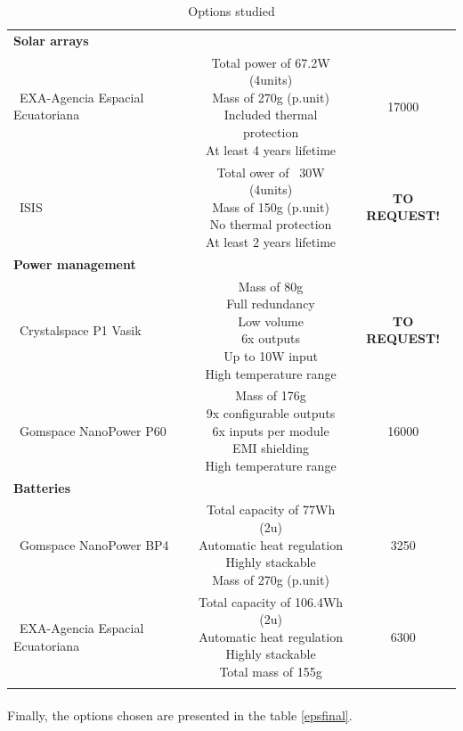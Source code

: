\begin{longtable}{| l | c | c | }
\rowcolor[gray]{0.85} \textbf{Solar arrays} &  &  \\
	   ~EXA-Agencia Espacial Ecuatoriana & \makecell{Total power of 67.2W (4units)\\ Mass of 270g (p.unit) \\ Included thermal protection \\At least 4 years lifetime} & 17000 \\
	   \hline
	   ~ISIS & \makecell{Total ower of ~30W (4units) \\ Mass of 150g (p.unit) \\ No thermal protection \\At least 2 years lifetime} & \textbf{TO REQUEST!} \\
	   \hline
\rowcolor[gray]{0.85} \textbf{Power management} &  &  \\
	   ~Crystalspace P1 Vasik & \makecell{Mass of 80g \\ Full redundancy \\ Low volume \\ 6x outputs \\ Up to 10W input \\ High temperature range} & \textbf{TO REQUEST!} \\
	\hline
	   ~Gomspace NanoPower P60 & \makecell{Mass of 176g \\ 9x configurable outputs \\ 6x inputs per module \\ EMI shielding \\ High temperature range} & 16000 \\
	\hline
\rowcolor[gray]{0.85} \textbf{Batteries} &  &  \\
	   ~Gomspace NanoPower BP4 & \makecell{Total capacity of 77Wh (2u) \\ Automatic heat regulation \\ Highly stackable \\ Mass of 270g (p.unit)} & 3250 \\
	\hline
	~EXA-Agencia Espacial Ecuatoriana & \makecell{Total capacity of 106.4Wh (2u)\\ Automatic heat regulation \\ Highly stackable \\ Total mass of 155g} & 6300 \\
	\hline
	
\caption{Options studied}
\label{epsoptions}
\end{longtable}

\paragraph{}Finally, the options chosen are presented in the table \ref{epsfinal}.

